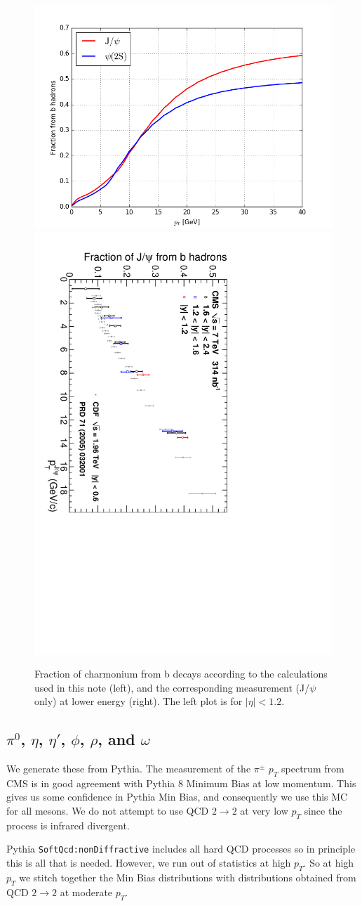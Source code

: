 \documentclass[12pt]{article}
\begin{document}
\begin{figure}
\includegraphics[width=0.53\linewidth]{plots/fraction-from-b-theory.png}
\includegraphics[height=0.46\linewidth, angle=90]{plots/bFraction-CMS-314nb-CDF.pdf}
\caption{Fraction of charmonium from b decays according to the calculations used in
  this note (left), and the corresponding measurement (J/$\psi$ only) at lower energy (right).
 The left plot is for $|\eta|<1.2$.}
  \label{fig:sanity}
\end{figure}



\subsection{$\pi^0$, $\eta$, $\eta'$, $\phi$, $\rho$, and $\omega$}
\label{sec:mesons}

We generate these from Pythia.  The measurement of the 
$\pi^{\pm}$
$p_T$ spectrum from CMS\cite{Sirunyan:2017zmn} is in good agreement
with Pythia 8 Minimum Bias at low momentum.  This gives us some
confidence in Pythia Min Bias, and consequently we use this MC for all
mesons.  We do not attempt to use QCD $2 \to 2$ at very low $p_T$ since the 
process is infrared divergent.

Pythia {\tt SoftQcd:nonDiffractive} includes all
hard QCD processes\cite{wwwPythia} so in principle this is all that is
needed.    However, we run out of statistics at high $p_T$.  So 
at high $p_T$ we stitch together the Min Bias distributions with 
distributions obtained from QCD $2 \to 2$ at moderate $p_T$.
\end{document}
